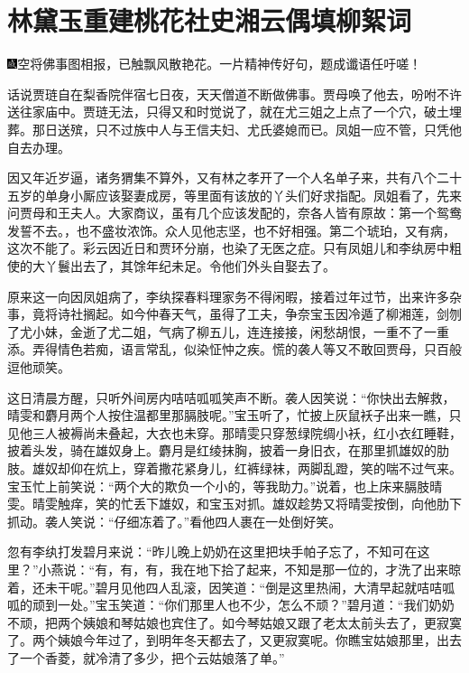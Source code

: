 
\chapter{林黛玉重建桃花社\hspace{.5em}史湘云偶填柳絮词}

{\includegraphics[width=3mm]{../Images/00005}\kaishu 空将佛事图相报，已触飘风散艳花。一片精神传好句，题成谶语任吁嗟！}

话说贾琏自在梨香院伴宿七日夜，天天僧道不断做佛事。贾母唤了他去，吩咐不许送往家庙中。贾琏无法，只得又和时觉说了，就在尤三姐之上点了一个穴，破土埋葬。那日送殡，只不过族中人与王信夫妇、尤氏婆媳而已。凤姐一应不管，只凭他自去办理。

因又年近岁逼，诸务猬集不算外，又有林之孝开了一个人名单子来，共有八个二十五岁的单身小厮应该娶妻成房，等里面有该放的丫头们好求指配。凤姐看了，先来问贾母和王夫人。大家商议，虽有几个应该发配的，奈各人皆有原故：第一个鸳鸯发誓不去。，也不盛妆浓饰。众人见他志坚，也不好相强。第二个琥珀，又有病，这次不能了。彩云因近日和贾环分崩，也染了无医之症。只有凤姐儿和李纨房中粗使的大丫鬟出去了，其馀年纪未足。令他们外头自娶去了。

原来这一向因凤姐病了，李纨探春料理家务不得闲暇，接着过年过节，出来许多杂事，竟将诗社搁起。如今仲春天气，虽得了工夫，争奈宝玉因冷遁了柳湘莲，剑刎了尤小妹，金逝了尤二姐，气病了柳五儿，连连接接，闲愁胡恨，一重不了一重添。弄得情色若痴，语言常乱，似染怔忡之疾。慌的袭人等又不敢回贾母，只百般逗他顽笑。

这日清晨方醒，只听外间房内咭咭呱呱笑声不断。袭人因笑说：``你快出去解救，晴雯和麝月两个人按住温都里那膈肢呢。''宝玉听了，忙披上灰鼠袄子出来一瞧，只见他三人被褥尚未叠起，大衣也未穿。那晴雯只穿葱绿院绸小袄，红小衣红睡鞋，披着头发，骑在雄奴身上。麝月是红绫抹胸，披着一身旧衣，在那里抓雄奴的肋肢。雄奴却仰在炕上，穿着撒花紧身儿，红裤绿袜，两脚乱蹬，笑的喘不过气来。宝玉忙上前笑说：``两个大的欺负一个小的，等我助力。''说着，也上床来膈肢晴雯。晴雯触痒，笑的忙丢下雄奴，和宝玉对抓。雄奴趁势又将晴雯按倒，向他肋下抓动。袭人笑说：``仔细冻着了。''看他四人裹在一处倒好笑。

忽有李纨打发碧月来说：``昨儿晚上奶奶在这里把块手帕子忘了，不知可在这里？''小燕说：``有，有，有，我在地下拾了起来，不知是那一位的，才洗了出来晾着，还未干呢。''碧月见他四人乱滚，因笑道：``倒是这里热闹，大清早起就咭咭呱呱的顽到一处。''宝玉笑道：``你们那里人也不少，怎么不顽？''碧月道：``我们奶奶不顽，把两个姨娘和琴姑娘也宾住了。如今琴姑娘又跟了老太太前头去了，更寂寞了。两个姨娘今年过了，到明年冬天都去了，又更寂寞呢。你瞧宝姑娘那里，出去了一个香菱，就冷清了多少，把个云姑娘落了单。''

